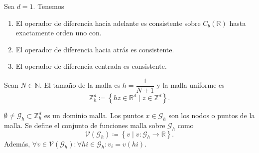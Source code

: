 \begin{proposition}[Consistencia]
	Sea $d=1$. Tenemos
	\begin{enumerate}
		\item

		      El operador de diferencia hacia adelante es consistente
		      sobre
		      \begin{math}
			      C_{b}\left(\mathbb{R}\right)
		      \end{math}
		      hasta exactamente orden uno con.

		\item

		      El operador de diferencia hacia atrás es consistente.

		\item

		      El operador de diferencia centrada es consistente.
	\end{enumerate}
\end{proposition}

\begin{definition}
	Sean $N\in\mathbb{N}$.
	El tamaño de la malla es
	\begin{math}
		h=
		\dfrac{1}{N+1}
	\end{math}
	y la malla uniforme es
	\begin{equation*}
		\mathbb{Z}^{d}_{h}\coloneqq
		\left\{
		hz\in\mathbb{R}^{d}\mid
		z\in\mathbb{Z}^{d}
		\right\}.
	\end{equation*}
\end{definition}

\begin{definition}
	\begin{math}
		\emptyset\neq\mathcal{G}_{h}\subset
		\mathbb{Z}^{d}_{h}
	\end{math}
	es un dominio malla.
	Los puntos $x\in\mathcal{G}_{h}$ son los nodos o puntos de la
	malla.
	Se define el conjunto de funciones malla sobre $\mathcal{G}_{h}$
	como
	\begin{equation*}
		\mathcal{V}
		\left(\mathcal{G}_{h}\right)\coloneqq
		\left\{
		v\mid v\colon\mathcal{G}_{h}\to\mathbb{R}
		\right\}.
	\end{equation*}
	Además,
	\begin{math}
		\forall v\in\mathcal{V}\left(\mathcal{G}_{h}\right):
		\forall hi\in\mathcal{G}_{h}:
		v_{i}=
		v\left(hi\right)
	\end{math}.
\end{definition}


